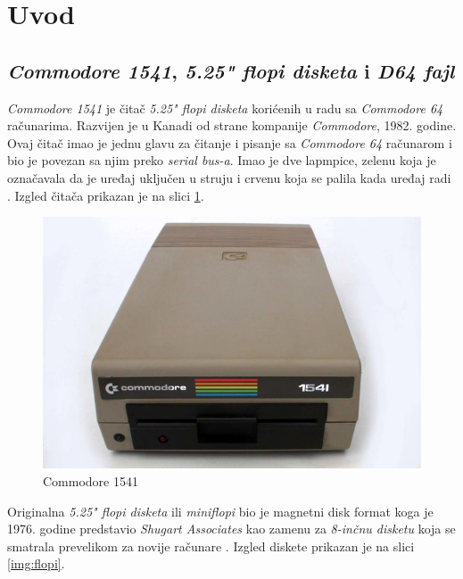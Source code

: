 \section{Uvod}

\subsection{\textit{Commodore 1541}, \textit{5.25" flopi disketa} i \textit{D64 fajl}}
\textit{Commodore 1541} je čitač \textit{5.25" flopi disketa} korićenih u radu sa \textit{Commodore 64} računarima. Razvijen je u Kanadi od strane kompanije \textit{Commodore}, 1982. godine. Ovaj čitač imao je jednu glavu za čitanje i pisanje sa \textit{Commodore 64} računarom i bio je povezan sa njim preko \textit{serial bus-a}. Imao je dve lapmpice, zelenu koja je označavala da je uređaj uključen u struju i crvenu koja se palila kada uređaj radi \cite{Commodore1541Text}. Izgled čitača prikazan je na slici \ref{img:commodore1541}.
\begin{figure}[ht]
\begin{center}
\includegraphics[width=\textwidth]{img/Commodore1541.jpg}
\caption[Commodore 1541 \textit{(preuzeto \cite{Commodore1541})}]{Commodore 1541}
\label{img:commodore1541}
\end{center}
\end{figure}

Originalna \textit{5.25" flopi disketa} ili \textit{miniflopi} bio je magnetni disk format koga je 1976. godine predstavio \textit{Shugart Associates} kao zamenu za \textit{8-inčnu disketu} koja se smatrala prevelikom za novije računare \cite{5.25Flopi}. Izgled diskete prikazan je na slici \ref{img:flopi}.

